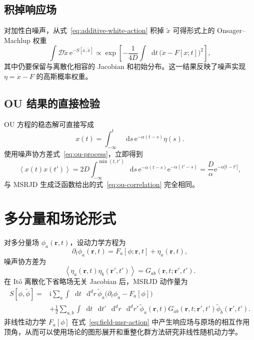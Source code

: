\documentclass[UTF8,11pt,a4paper]{ctexart}
\newcommand{\dd}{\mathop{}\!\mathrm{d}}
\newcommand{\ii}{\mathrm{i}}
\newcommand{\ee}{\mathrm{e}}
\newcommand{\D}{\mathcal D}
\newcommand{\avg}[1]{\left\langle #1\right\rangle}
\begin{document}
\subsection{积掉响应场}

对加性白噪声，从式~\eqref{eq:additive-white-action} 积掉 $\widetilde x$ 可得形式上的 Onsager--Machlup 权重
\begin{equation}
  \int\D\widetilde x\,
  \ee^{-S[x,\widetilde x]}
  \propto
  \exp\!\left[
  -\frac{1}{4D}
  \int\dd t\,
  \bigl(\dot x-F[x;t]\bigr)^2
  \right],
  \label{eq:onsager-machlup-check}
\end{equation}
其中仍要保留与离散化相容的 Jacobian 和初始分布。这一结果反映了噪声实现
$\eta=\dot x-F$ 的高斯概率权重。

\subsection{OU 结果的直接检验}

OU 方程的稳态解可直接写成
\begin{equation}
  x(t)=\int_{-\infty}^{t}\dd s\,
  \ee^{-\alpha(t-s)}\eta(s).
\end{equation}
使用噪声协方差式~\eqref{eq:ou-process}，立即得到
\begin{equation}
  \avg{x(t)x(t')}
  =2D\int_{-\infty}^{\min(t,t')}\dd s\,
  \ee^{-\alpha(t-s)}\ee^{-\alpha(t'-s)}
  =\frac{D}{\alpha}\ee^{-\alpha|t-t'|},
\end{equation}
与 MSRJD 生成泛函数给出的式~\eqref{eq:ou-correlation} 完全相同。

\section{多分量和场论形式}

对多分量场 $\phi_a(\bm r,t)$，设动力学方程为
\begin{equation}
  \partial_t\phi_a(\bm r,t)
  =F_a[\phi;\bm r,t]+\eta_a(\bm r,t),
\end{equation}
噪声协方差为
\begin{equation}
  \avg{\eta_a(\bm r,t)\eta_b(\bm r',t')}
  =G_{ab}(\bm r,t;\bm r',t').
\end{equation}
在 It\^o 离散化下省略场无关 Jacobian 后，MSRJD 动作量为
\begin{align}
  S[\phi,\widetilde\phi]
  ={}&\ii\sum_a\int\dd t\,\dd^d r\,
  \widetilde\phi_a
  \bigl(\partial_t\phi_a-F_a[\phi]\bigr)
  \nonumber\\
  &+\frac12\sum_{a,b}
  \int\dd t\,\dd t'\,\dd^d r\,\dd^d r'\,
  \widetilde\phi_a(\bm r,t)
  G_{ab}(\bm r,t;\bm r',t')
  \widetilde\phi_b(\bm r',t').
  \label{eq:field-msr-action}
\end{align}
非线性动力学 $F_a[\phi]$ 在式~\eqref{eq:field-msr-action} 中产生响应场与原场的相互作用顶角，从而可以使用场论的图形展开和重整化群方法研究非线性随机动力学。
\end{document}
